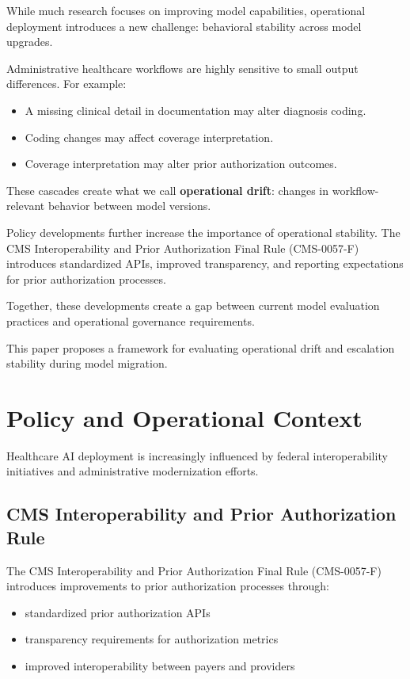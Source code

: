 \documentclass[11pt]{article}
\begin{document}
While much research focuses on improving model capabilities, operational deployment introduces a new challenge: behavioral stability across model upgrades.

Administrative healthcare workflows are highly sensitive to small output differences. For example:

\begin{itemize}
\item A missing clinical detail in documentation may alter diagnosis coding.
\item Coding changes may affect coverage interpretation.
\item Coverage interpretation may alter prior authorization outcomes.
\end{itemize}

These cascades create what we call \textbf{operational drift}: changes in workflow-relevant behavior between model versions.

Policy developments further increase the importance of operational stability. The CMS Interoperability and Prior Authorization Final Rule (CMS-0057-F) introduces standardized APIs, improved transparency, and reporting expectations for prior authorization processes.

Together, these developments create a gap between current model evaluation practices and operational governance requirements.

This paper proposes a framework for evaluating operational drift and escalation stability during model migration.

\section{Policy and Operational Context}

Healthcare AI deployment is increasingly influenced by federal interoperability initiatives and administrative modernization efforts.

\subsection{CMS Interoperability and Prior Authorization Rule}

The CMS Interoperability and Prior Authorization Final Rule (CMS-0057-F) introduces improvements to prior authorization processes through:

\begin{itemize}
\item standardized prior authorization APIs
\item transparency requirements for authorization metrics
\item improved interoperability between payers and providers
\end{itemize}
\end{document}
